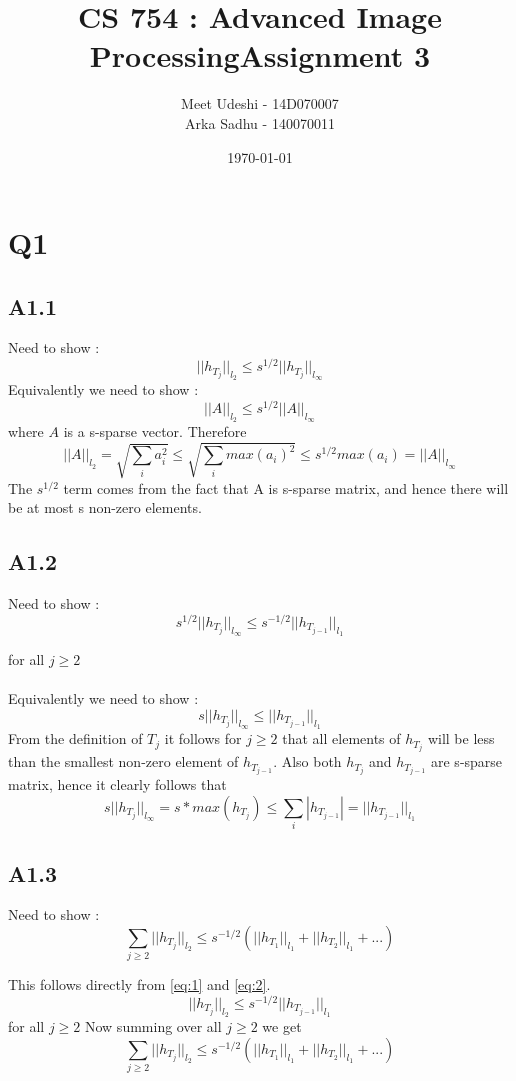 \documentclass{article}
\title{CS 754 : Advanced Image ProcessingAssignment 3}
\author{Meet Udeshi - 14D070007\\
  Arka Sadhu - 140070011\\
}
\date{\today}
\newcommand{\lone}[1]{
  ||#1||_{l_1}
}
\newcommand{\ltwo}[1]{
  ||#1||_{l_2}
}
\newcommand{\linf}[1]{
  ||#1||_{l_\infty}
}
\newcommand{\htj}[1]{
  h_{T_{#1}}
}
\begin{document}
\maketitle
\section*{Q1}
\subsection*{A1.1}
Need to show :
\begin{equation}\label{eq:1}
  \ltwo{h_{T_j}} \le s^{1/2} \linf{h_{T_j}}
\end{equation}
Equivalently we need to show :
$$\ltwo{A} \le s^{1/2} \linf{A}$$
where $A$ is a s-sparse vector.
Therefore
$$\ltwo{A} = \sqrt{\sum_{i}a_i^2} \le \sqrt{\sum_i max(a_i)^2} \le s^{1/2}max(a_i) = \linf{A}$$
The $s^{1/2}$ term comes from the fact that A is s-sparse matrix, and hence there will be at most s non-zero elements.

\subsection*{A1.2}
Need to show :
\begin{equation}\label{eq:2}
  s^{1/2}\linf{h_{T_j}} \le s^{-1/2}\lone{\htj{j-1}}
\end{equation}

for all $j \ge 2$\\\\
Equivalently we need to show :
$$s\linf{\htj{j}} \le \lone{\htj{j-1}}$$
From the definition of $T_j$ it follows for $j \ge 2$ that all elements of $\htj{j}$ will be less than the smallest non-zero element of
$\htj{j-1}$. Also both $\htj{j}$ and $\htj{j-1}$ are s-sparse matrix, hence it clearly follows that
$$s \linf{\htj{j}} = s*max(\htj{j}) \le \sum_i |\htj{j-1}| = \lone{\htj{j-1}} $$

\subsection*{A1.3}
Need to show :
\begin{equation}\label{eq:3}
  \sum_{j \ge 2} \ltwo{\htj{j}} \le s^{-1/2}(\lone{\htj{1}} + \lone{\htj{2}} + ...)
\end{equation}

This follows directly from \ref{eq:1} and \ref{eq:2}.
$$\ltwo{\htj{j}} \le s^{-1/2} \lone{\htj{j-1}}$$
for all $j \ge 2$
Now summing over all $j \ge 2$ we get
$$\sum_{j \ge 2} \ltwo{\htj{j}} \le s^{-1/2}(\lone{\htj{1}} + \lone{\htj{2}} + ...)$$
\end{document}
